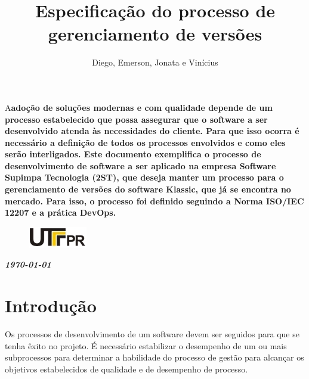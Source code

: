 \documentclass[	DIV=calc,%
							paper=a4,%
							fontsize=12pt,%
							onecolumn]{scrartcl}	 					%
\title{Especificação do processo de gerenciamento de versões}					%
\author{Diego, Emerson, Jonata e Vinícius }  	%
\date{}																				%
\newcommand{\initial}[1]{%
     \lettrine[lines=3,lhang=0.3,nindent=0em]{
     				\color{DarkGoldenrod}
     				{\textsf{#1}}}{}}
\begin{document}
\maketitle
\thispagestyle{fancy} 	
\thispagestyle{empty}		%




\initial{A}\textbf{adoção de soluções modernas e com qualidade depende de um processo estabelecido que possa assegurar que o software a
ser desenvolvido atenda às necessidades do cliente. Para que isso ocorra é necessário a
definição de todos os processos envolvidos e como eles serão interligados.
Este documento exemplifica o processo de desenvolvimento de software a ser aplicado 
na empresa Software Supimpa Tecnologia (2ST), que deseja manter um processo para o gerenciamento de versões do software Klassic, que já se encontra no mercado. Para isso, o processo foi definido seguindo a Norma ISO/IEC 12207 e a prática DevOps. }

\begin{figure}
	\centering
	\includegraphics{utfpr}
\end{figure}

\vspace{3cm}
\centerline{\textit{\textbf{\today}}}


\clearpage
\renewcommand{\contentsname}{Sumário}
\tableofcontents
\clearpage

\section{Introdução}

Os processos de desenvolvimento de um software devem ser seguidos para que se tenha êxito no projeto. É necessário 
estabilizar o desempenho de um ou mais subprocessos para determinar a habilidade do processo de gestão para alcançar os objetivos estabelecidos de qualidade e de desempenho de processo.
\end{document}
